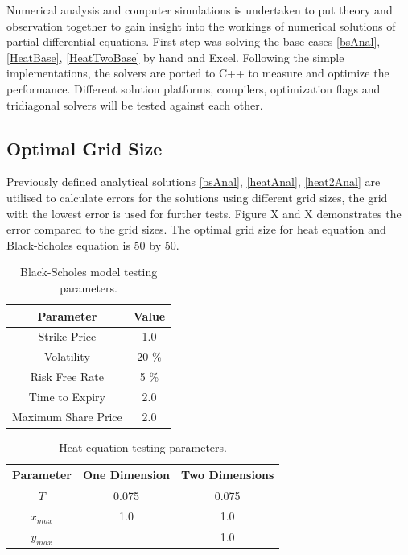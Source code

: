 \documentclass[12pt, oneside]{book}
\theoremstyle{plain}
\theoremstyle{definition}
\begin{document}
Numerical analysis and computer simulations is undertaken to put theory and observation together to gain insight into the workings of numerical solutions of partial differential equations. First step was solving the base cases \ref{bsAnal}, \ref{HeatBase}, \ref{HeatTwoBase} by hand and Excel. Following the simple implementations, the solvers are ported to C++ to measure and optimize the performance.
Different solution platforms, compilers, optimization flags and tridiagonal solvers will be tested against each other.
 
\subsection{Optimal Grid Size}
Previously defined analytical solutions \ref{bsAnal}, \ref{heatAnal}, \ref{heat2Anal} are utilised to calculate errors for the solutions using different grid sizes, the grid with the lowest error is used for further tests. Figure X and X demonstrates the error compared to the grid sizes. The optimal grid size for heat equation and Black-Scholes equation is 50 by 50.

\begin{table}[h!]
\centering
 \begin{tabular}{||c c||} 
 \hline
 Parameter & Value\\ [0.5ex]
 \hline\hline
 Strike Price & 1.0\\ 
 Volatility & 20 \% \\
 Risk Free Rate & 5 \% \\
 Time to Expiry & 2.0\\
 Maximum Share Price & 2.0\\ [1ex] 
 \hline
 \end{tabular}
 \caption{Black-Scholes model testing parameters.}
\end{table}
\begin{table}[h!]
\centering
 \begin{tabular}{||c c c||} 
 \hline
 Parameter & One Dimension & Two Dimensions\\ [0.5ex]
 \hline\hline
  $T$ & 0.075 & 0.075\\ 
  $ x_{max} $ & 1.0  & 1.0  \\ 
   $ y_{max} $  &   & 1.0  \\ [1ex] 
 \hline
 \end{tabular}
 \caption{Heat equation testing parameters.}
\end{table}
 
\end{document}
